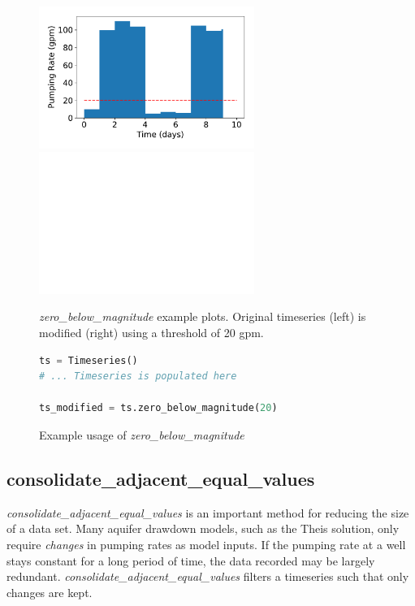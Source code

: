 \documentclass[10pt,twoside,openright]{memoir}
\begin{document}
\begin{figure}[!h]
\includegraphics[width=7cm]{python/timeseries_zero_below_magnitude_before.pdf}
\hspace{\fill}
\includegraphics[width=7cm]{python/timeseries_zero_below_magnitude_after.pdf}
\caption{ \emph{zero\_below\_magnitude} example plots. 
    Original timeseries (left) is modified (right) using a threshold of 20 gpm.}
\end{figure}

\begin{figure}[!h]
\begin{lstlisting}[language=python]
ts = Timeseries()
# ... Timeseries is populated here

ts_modified = ts.zero_below_magnitude(20)
\end{lstlisting}
\caption{Example usage of \emph{zero\_below\_magnitude}}
\end{figure}

\subsection{consolidate\_adjacent\_equal\_values}
\emph{consolidate\_adjacent\_equal\_values} is an important method for reducing
the size of a data set. Many aquifer drawdown models, such as the Theis solution, 
only require \emph{changes} in pumping rates as model inputs. If the pumping rate
at a well stays constant for a long period of time, the data recorded may be largely
redundant. \emph{consolidate\_adjacent\_equal\_values} filters a timeseries
such that only changes are kept. 
\end{document}

